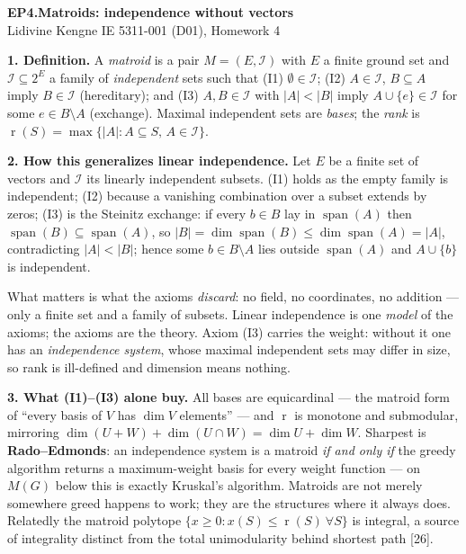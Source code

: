 \documentclass[10pt]{article}
\DeclareMathOperator{\rank}{r}
\DeclareMathOperator{\spn}{span}
\DeclareMathOperator{\dimop}{dim}
\begin{document}
{\large\bfseries EP4.\quad Matroids: independence without vectors}\\[1pt]
{\small Lidivine Kengne \quad\textbar\quad IE 5311-001 (D01), Homework 4}
\vspace{0.3em}

\textbf{1. Definition.}
A \emph{matroid} is a pair $M = (E, \mathcal{I})$ with $E$ a finite
ground set and $\mathcal{I} \subseteq 2^{E}$ a family of
\emph{independent} sets such that
(I1) $\emptyset \in \mathcal{I}$;
(I2) $A \in \mathcal{I}$, $B \subseteq A$ imply $B \in \mathcal{I}$
(hereditary); and
(I3) $A, B \in \mathcal{I}$ with $|A| < |B|$ imply
$A \cup \{e\} \in \mathcal{I}$ for some $e \in B \setminus A$
(exchange).
Maximal independent sets are \emph{bases}; the \emph{rank} is
$\rank(S) = \max\{|A| : A \subseteq S,\, A \in \mathcal{I}\}$.

\textbf{2. How this generalizes linear independence.}
Let $E$ be a finite set of vectors and $\mathcal{I}$ its linearly
independent subsets. (I1) holds as the empty family is independent;
(I2) because a vanishing combination over a subset extends by zeros;
(I3) is the Steinitz exchange: if every $b \in B$ lay in $\spn(A)$ then
$\spn(B) \subseteq \spn(A)$, so
$|B| = \dimop\spn(B) \le \dimop\spn(A) = |A|$, contradicting
$|A| < |B|$; hence some $b \in B \setminus A$ lies outside $\spn(A)$
and $A \cup \{b\}$ is independent.

What matters is what the axioms \emph{discard}: no field, no
coordinates, no addition --- only a finite set and a family of subsets.
Linear independence is one \emph{model} of the axioms; the axioms are
the theory. Axiom (I3) carries the weight: without it one has an
\emph{independence system}, whose maximal independent sets may differ
in size, so rank is ill-defined and dimension means nothing.

\textbf{3. What (I1)--(I3) alone buy.}
All bases are equicardinal --- the matroid form of ``every basis of $V$
has $\dimop V$ elements'' --- and $\rank$ is monotone and submodular,
mirroring $\dimop(U+W) + \dimop(U \cap W) = \dimop U + \dimop W$.
Sharpest is \textbf{Rado--Edmonds}: an independence system is a matroid
\emph{if and only if} the greedy algorithm returns a maximum-weight
basis for every weight function --- on $M(G)$ below this is exactly
Kruskal's algorithm. Matroids are not merely somewhere greed happens to
work; they are the structures where it always does. Relatedly the
matroid polytope $\{x \ge 0 : x(S) \le \rank(S)\ \forall S\}$ is
integral, a source of integrality distinct from the total unimodularity
behind shortest path [26].
\end{document}
